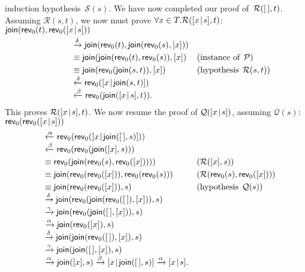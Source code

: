 induction hypothesis~\(\mathcal{S}(s)\). We have now completed our
proof of~\(\mathcal{R}([\,],t)\). Assuming \(\mathcal{R}(s,t)\), we now
must prove \(\forall x \in T.\mathcal{R}([{x}\!\mid\!{s}],t)\):\\
\noindent\(\textsf{join}(\textsf{rev}_0(t),\textsf{rev}_0([{x}\!\mid\!{s}]))\)
\begin{align*}
\hphantom{HHHHH}
&\xrightarrow{\smash{\delta}}
\textsf{join}(\textsf{rev}_0(t),\textsf{join}(\textsf{rev}_0(s),[x]))\\
&\equiv \textsf{join}(\textsf{join}(\textsf{rev}_0(t),\textsf{rev}_0(s)),[x])
&& (\text{instance of} \,\; \mathcal{P})\\
&\equiv \textsf{join}(\textsf{rev}_0(\textsf{join}(s,t)),[x])
&& (\text{hypothesis} \,\; \mathcal{R}(s,t))\\
&\xleftarrow{\smash{\delta}}
\textsf{rev}_0([{x}\!\mid\!{\textsf{join}(s,t)}])\\
&\xleftarrow{\smash{\beta}}
\textsf{rev}_0(\textsf{join}([{x}\!\mid\!{s}],t)).
\end{align*}
This proves \(\mathcal{R}([{x}\!\mid\!{s}],t)\). We now resume the proof of
\(\mathcal{Q}([{x}\!\mid\!{s}])\), assuming \(\mathcal{Q}(s)\):\\
\noindent\(\textsf{rev}_0(\textsf{rev}_0([{x}\!\mid\!{s}]))\)
\begin{align*}
\hphantom{HH}
&\xleftarrow{\smash{\alpha}}
\textsf{rev}_0(\textsf{rev}_0([{x}\!\mid\!{\textsf{join}([\,],s)}]))\\
&\xleftarrow{\smash{\beta}}
\textsf{rev}_0(\textsf{rev}_0(\textsf{join}([x],s)))\\
&\equiv
\textsf{rev}_0(\textsf{join}(\textsf{rev}_0(s),\textsf{rev}_0([x]))))
&& (\mathcal{R}([x],s))\\
&\equiv
\textsf{join}(\textsf{rev}_0(\textsf{rev}_0([x])),\textsf{rev}_0(\textsf{rev}_0(s)))
&& (\mathcal{R}(\textsf{rev}_0(s),\textsf{rev}_0([x])))\\
&\equiv
\textsf{join}(\textsf{rev}_0(\textsf{rev}_0([x])),s)
&& (\text{hypothesis} \,\; \mathcal{Q}(s))\\
&\xrightarrow{\smash{\delta}}
\textsf{join}(\textsf{rev}_0(\textsf{join}(\textsf{rev}_0([\,]),[x])),s)\\
&\xrightarrow{\smash{\gamma}}
\textsf{join}(\textsf{rev}_0(\textsf{join}([\,],[x])),s)\\
&\xrightarrow{\smash{\alpha}}
\textsf{join}(\textsf{rev}_0([x]),s)\\
&\xrightarrow{\smash{\delta}}
\textsf{join}(\textsf{join}(\textsf{rev}_0([\,]),[x]),s)\\
&\xrightarrow{\smash{\gamma}}
\textsf{join}(\textsf{join}([\,],[x]),s)\\
&\xrightarrow{\smash{\alpha}}
\textsf{join}([x],s)
\xrightarrow{\smash{\beta}}
[{x}\!\mid\!{\textsf{join}([\,],s)}]
\xrightarrow{\smash{\alpha}}
[{x}\!\mid\!{s}].
\end{align*}

